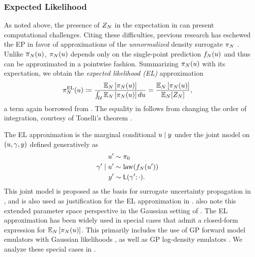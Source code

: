 \documentclass[12pt]{article}
\begin{document}
\subsubsection{Expected Likelihood}
As noted above, the presence of $Z_{N}$ in the expectation in 
can present computational challenges. Citing these difficulties, previous research has 
eschewed the EP in favor of approximations of the \textit{unnormalized}
density surrogate $\pi_{N}$ \citep{StuartTeck1,StuartTeck2,VehtariParallelGP}. Unlike 
$\overline{\pi}_{N}(u)$, $\pi_{N}(u)$ depends only on the single-point prediction 
$f_{N}(u)$ and thus can be approximated in a pointwise fashion. 
Summarizing $\pi_{N}(u)$ with its expectation, we obtain the \textit{expected likelihood (EL)} approximation
\begin{equation}
\pi_{N}^{\mathrm{EL}}(u) \coloneqq 
\frac{\mathbb{E}_{N}\left[\pi_{N}(u) \right]}{\int_{\mathcal{U}} \mathbb{E}_{N}\left[\pi_{N}(u) \right] du}
= \frac{\mathbb{E}_{N}\left[\pi_{N}(u) \right]}{\mathbb{E}_{N}[Z_{N}]}, \label{eq:post-approx-EL} 
\end{equation}
a term again borrowed from \cite{BurknerSurrogate}. The equality in  follows from
changing the order of integration, courtesy of Tonelli's theorem \citep{StuartTeck1}. 

The EL approximation is the marginal conditional $u \mid y$ under the joint model on 
$(u, \gamma, y)$ defined generatively as
\begin{align}
u^\prime &\sim \pi_0 \label{eq:el-prob-model} \\
\gamma^\prime \mid u^\prime &\sim \mathrm{law}(f_{N}(u^\prime)) \nonumber \\
y^\prime &\sim \mathsf{L}(\gamma^\prime; \cdot). \nonumber
\end{align}
This joint model is proposed as the basis for surrogate uncertainty propagation in 
\citet{BilionisBayesSurrogates}, and is also used as justification for the EL approximation
in \citet{SinsbeckNowak}. \citet{StuartTeck2,CES} also note this extended parameter space 
perspective in the Gaussian setting of . The EL approximation
has been widely used in special cases that admit a closed-form expression for 
$\mathbb{E}_{N}\left[\pi_{N}(u) \right]$. This primarily includes the use of GP forward
model emulators with Gaussian likelihoods 
\citep{weightedIVAR,StuartTeck2,GP_PDE_priors,CES,idealizedGCM,
villani2024posteriorsamplingadaptivegaussian,hydrologicalModel,hydrologicalModel2},
as well as GP log-density emulators 
\citep{VehtariParallelGP,StuartTeck1,StuartTeck2,GP_PDE_priors, random_fwd_models,TeckHyperpar}. 
We analyze these special cases in .
\end{document}
